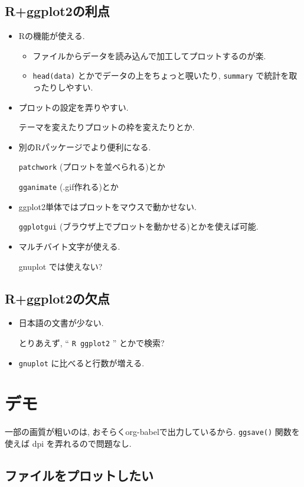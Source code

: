 \documentclass[lualatex,a4paper,12pt,report,ja=standard]{bxjsarticle}
\begin{document}
\subsection{R+ggplot2の利点}
\label{sec:org42bc43c}
\begin{itemize}
\item Rの機能が使える.
\begin{itemize}
\item ファイルからデータを読み込んで加工してプロットするのが楽.
\item \texttt{head(data)} とかでデータの上をちょっと覗いたり,
\texttt{summary} で統計を取ったりしやすい.
\end{itemize}
\item プロットの設定を弄りやすい.

テーマを変えたりプロットの枠を変えたりとか.
\item 別のRパッケージでより便利になる.

\texttt{patchwork} (プロットを並べられる)とか

\texttt{gganimate} (.gif作れる)とか
\item ggplot2単体ではプロットをマウスで動かせない.

\texttt{ggplotgui} (ブラウザ上でプロットを動かせる)とかを使えば可能.
\item マルチバイト文字が使える.

gnuplot では使えない?
\end{itemize}
\subsection{R+ggplot2の欠点}
\label{sec:orge9f3436}
\begin{itemize}
\item 日本語の文書が少ない.

とりあえず, `` \texttt{R ggplot2} '' とかで検索?
\item \texttt{gnuplot} に比べると行数が増える.
\end{itemize}
\section{デモ}
\label{sec:org8f6ea8e}
一部の画質が粗いのは, おそらくorg-babelで出力しているから.
\texttt{ggsave()} 関数を使えば dpi を弄れるので問題なし.
\subsection{ファイルをプロットしたい}
\label{sec:org78eb7ab}
\end{document}
